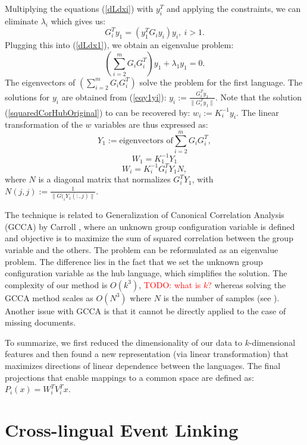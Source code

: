 \documentclass[twoside,11pt]{article}
\newcommand{\todo}[1]{\textcolor{red}{TODO: #1}}
\begin{document}
Multiplying the equations (\ref{dLdxi}) with $y_i^T$ and applying the constraints, we can eliminate $\lambda_i$ which gives us:
\begin{equation}\label{eqy1yi}
G_{i}^T y_1 = \left(y_1^T G_{i} y_i \right) y_i,~i > 1.
\end{equation}
Plugging this into (\ref{dLdx1}), we obtain an eigenvalue problem:
$$\left( \sum_{i = 2}^m G_i G_{i}^T \right) y_1 + \lambda_1 y_1 = 0.$$
The eigenvectors of $\left( \sum_{i = 2}^m G_i G_{i}^T \right)$ solve the problem for the first language. The solutions for $y_i$ are obtained from (\ref{eqy1yi}): $y_i := \frac{G_{i}^T y_1}{\| G_{i}^T y_1 \|}$.
Note that the solution (\ref{squaredCorHubOriginal}) to can be recovered by: $w_i := K_i^{-1} y_i$. The linear transformation of the $w$ variables are thus expressed as:
$$ Y_1 := \text{eigenvectors of} \sum_{i = 2}^m G_i G_{i}^T, $$
$$ W_1 = K_1^{-1} Y_1 $$
$$ W_i = K_i^{-1} G_{i}^T Y_1 N,$$
where $N$ is a diagonal matrix that normalizes $G_{i}^T Y_1$, with $N(j,j) := \frac{1}{\|G(_{i} Y_1(:,j)\|}$.

 The technique is related to  Generalization of Canonical Correlation Analysis (GCCA) by Carroll \citeyear{Carroll}, where an unknown group configuration variable is defined and objective is to maximize the sum of squared correlation between the group variable and the others. The problem can be reformulated as an eigenvalue problem. The difference lies in the fact that we set the unknown group configuration variable as the hub language, which simplifies the solution. The complexity of our method is $O(k^3)$, \todo{what is $k$?} whereas solving the GCCA method scales as $O(N^3)$ where $N$ is the number of samples (see \cite{gifi}). Another issue with GCCA is that it cannot be directly applied to the case of missing documents.

To summarize, we first reduced the dimensionality of our data to $k$-dimensional features and then found a new representation (via linear transformation) that maximizes directions of linear dependence between the languages. The final projections that enable mappings to a common space are defined as: $P_i(x) = W_i^T V_i^T x.$




\section{Cross-lingual Event Linking}\label{sec:linking}
\end{document}
